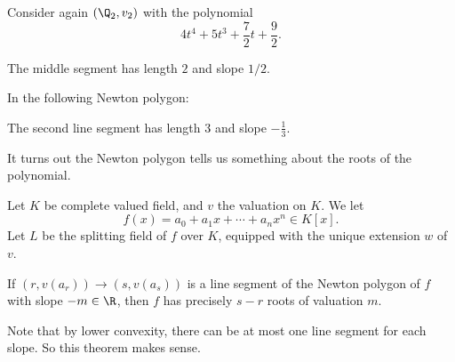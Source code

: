 \documentclass[a4paper]{article}
\begin{document}
\begin{eg}
  Consider again $(\Q_2, v_2)$ with the polynomial
  \[
    4t^4 + 5t^3 + \frac{7}{2}t + \frac{9}{2}.
  \]
  \begin{center}
  \end{center}
  The middle segment has length $2$ and slope $1/2$.
\end{eg}
\begin{eg}
  In the following Newton polygon:
  \begin{center}
  \end{center}
  The second line segment has length $3$ and slope $-\frac{1}{3}$.
\end{eg}

It turns out the Newton polygon tells us something about the roots of the polynomial.
\begin{thm}
  Let $K$ be complete valued field, and $v$ the valuation on $K$. We let
  \[
    f(x) = a_0 + a_1 x + \cdots + a_n x^n \in K[x].
  \]
  Let $L$ be the splitting field of $f$ over $K$, equipped with the unique extension $w$ of $v$.

  If $(r, v(a_r)) \to (s, v(a_s))$ is a line segment of the Newton polygon of $f$ with slope $-m \in \R$, then $f$ has precisely $s - r$ roots of valuation $m$.
\end{thm}
Note that by lower convexity, there can be at most one line segment for each slope. So this theorem makes sense.
\end{document}
